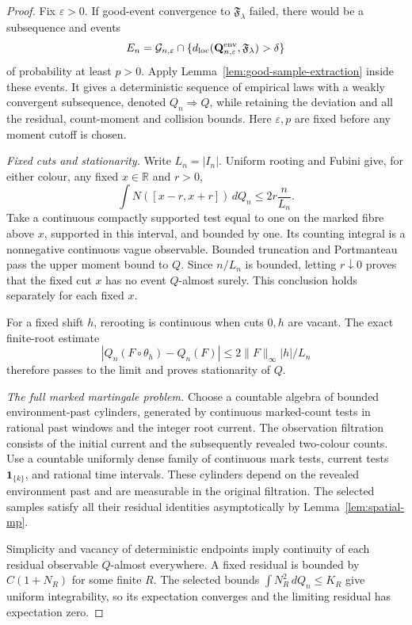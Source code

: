 \documentclass[11pt,reqno]{amsart}
\theoremstyle{definition}
\theoremstyle{remark}
\numberwithin{equation}{section}
\newcommand{\R}{\mathbb R}
\newcommand{\cF}{\mathfrak F}
\begin{document}
\begin{proof}
Fix \(\varepsilon>0\).  If good-event convergence to
\(\cF_\lambda\) failed, there would be a subsequence and events
\[
E_n=\mathcal G_{n,\varepsilon}\cap
 \{d_{\rm loc}(\mathbf Q_{n,\varepsilon}^{\rm env},\cF_\lambda)>\delta\}
\]
of probability at least \(p>0\).  Apply
Lemma~\ref{lem:good-sample-extraction} inside these events.  It gives a
deterministic sequence of empirical laws with a weakly
convergent subsequence, denoted \(Q_n\Rightarrow Q\), while retaining
the deviation and all the residual, count-moment and collision bounds.
Here \(\varepsilon,p\) are fixed before any moment cutoff is chosen.

\emph{Fixed cuts and stationarity.}
Write \(L_n=|I_n|\).  Uniform rooting and Fubini give, for either colour,
any fixed \(x\in\R\) and \(r>0\),
\[
\int N([x-r,x+r])\,dQ_n\le 2r\frac n{L_n}.
\]
Take a continuous compactly supported test equal to one on the marked
fibre above \(x\), supported in this interval, and bounded by one.
Its counting integral is a nonnegative continuous vague observable.
Bounded truncation and Portmanteau pass the upper moment bound to
\(Q\).  Since \(n/L_n\) is bounded, letting \(r\downarrow0\) proves
that the fixed cut \(x\) has no event \(Q\)-almost surely.
This conclusion holds separately for each fixed \(x\).

For a fixed shift \(h\), rerooting is continuous when cuts \(0,h\)
are vacant.  The exact finite-root estimate
\[
|Q_n(F\circ\theta_h)-Q_n(F)|
 \le 2\|F\|_\infty |h|/L_n
\]
therefore passes to the limit and proves stationarity of \(Q\).

\emph{The full marked martingale problem.}
Choose a countable algebra of bounded environment-past cylinders,
generated by continuous marked-count tests in rational past windows
and the integer root current.  The observation filtration consists of
the initial current and the subsequently revealed two-colour counts.
Use a countable uniformly dense family of continuous mark tests,
current tests \(\mathbf1_{\{k\}}\), and rational time intervals.
These cylinders depend on the revealed environment past and are
measurable in the original filtration.
The selected samples satisfy all their residual identities asymptotically
by Lemma~\ref{lem:spatial-mp}.

Simplicity and vacancy of deterministic endpoints imply continuity of
each residual observable \(Q\)-almost everywhere.  A fixed residual
is bounded by \(C(1+N_R)\) for some finite \(R\).
The selected bounds \(\int N_R^2\,dQ_n\le K_R\) give uniform
integrability, so its expectation converges and the limiting residual
has expectation zero.


\end{proof}
\end{document}
